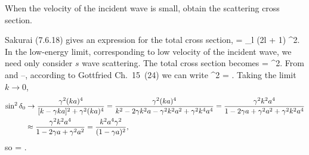 \begin{problem}
	When the velocity of the incident wave is small, obtain the scattering cross section.
\end{problem}

\begin{solution}
	Sakurai (7.6.18) gives an expression for the total cross section,
	\beq
		\sigtot =  \sum_{l} (2l + 1) \sin^2\dell.
	\eeq
	In the low-energy limit, corresponding to low velocity of the incident wave, we need only consider $s$ wave scattering.  The total cross section becomes
	\beq
		\sigtot =  \sin^2\delo.
	\eeq
	From  and --, according to Gottfried Ch.~15~(24) we can write
	\beq
		\sin^2 \delo = .
	\eeq
	Taking the limit $k \to 0$,
	\begin{align*}
		\sin^2 \delta_0 &\to 
		\frac{\gamma^2 (ka)^4}{[k - \gamma ka]^2 + \gamma^2 (ka)^4}
		= \frac{\gamma^2 (ka)^4}{k^2 - 2 \gamma k^2 a - \gamma^2 k^2 a^2 + \gamma^2 k^4 a^4}
		= \frac{\gamma^2 k^2 a^4}{1 - 2 \gamma a + \gamma^2 a^2 + \gamma^2 k^2 a^4} \\
		&\approx \frac{\gamma^2 k^2 a^4}{1 - 2 \gamma a + \gamma^2 a^2}
		= \frac{k^2 a^4 \gamma^2}{(1 - \gamma a)^2},
	\end{align*}
	so
	\beq
		\sigtot = .
	\eeq
	\vfix
\end{solution}